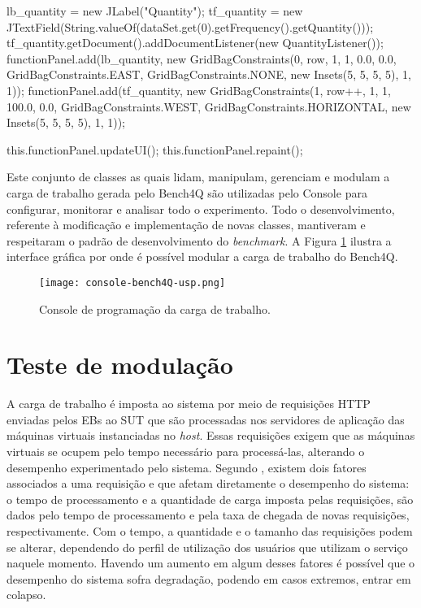 \begin{codigo}[caption={Código para gerar a os parâmetros para a modulação}, label={code:panel}, breaklines=true]
{		lb_quantity = new JLabel("Quantity");
		tf_quantity = new JTextField(String.valueOf(dataSet.get(0).getFrequency().getQuantity()));
		tf_quantity.getDocument().addDocumentListener(new QuantityListener());
		functionPanel.add(lb_quantity, new GridBagConstraints(0, row, 1, 1, 0.0, 0.0, GridBagConstraints.EAST,
		GridBagConstraints.NONE, new Insets(5, 5, 5, 5), 1, 1));
		functionPanel.add(tf_quantity, new GridBagConstraints(1, row++, 1, 1, 100.0, 0.0, GridBagConstraints.WEST,
		GridBagConstraints.HORIZONTAL, new Insets(5, 5, 5, 5), 1, 1));
		
		this.functionPanel.updateUI();
		this.functionPanel.repaint();
		
	}
\end{codigo}

Este conjunto de classes as quais lidam, manipulam, gerenciam e modulam a carga de trabalho gerada pelo Bench4Q são utilizadas pelo Console para configurar, monitorar e analisar todo o experimento. Todo o desenvolvimento, referente à modificação e implementação de novas classes, mantiveram e respeitaram o padrão de desenvolvimento do \textit{benchmark}. A Figura \ref{fig:interface-criada-beanch4q} ilustra a interface gráfica por onde é possível modular a carga de trabalho do Bench4Q. 

\begin{figure}[!htb]
	\centering
	\texttt{[image: console-bench4Q-usp.png]}
	\caption{Console de programação da carga de trabalho.}
	\label{fig:interface-criada-beanch4q}
	\fautor
\end{figure}


\section{Teste de modulação}

A carga de trabalho é imposta ao sistema por meio de requisições HTTP enviadas pelos EBs ao SUT que são processadas nos servidores de aplicação das máquinas virtuais instanciadas no \textit{host}. Essas requisições exigem que as máquinas virtuais se ocupem pelo tempo necessário para processá-las, alterando o desempenho experimentado pelo sistema.
Segundo , existem dois fatores associados a uma requisição e que afetam diretamente o desempenho do sistema:
o tempo de processamento e a quantidade de carga imposta pelas requisições, são dados pelo tempo de processamento e pela taxa de chegada de novas requisições, respectivamente. Com o tempo, a quantidade e o tamanho das requisições podem se alterar, dependendo do perfil de utilização dos usuários que utilizam o serviço naquele momento. Havendo um aumento em algum desses fatores é possível que o desempenho do sistema sofra degradação, podendo em casos extremos, entrar em colapso.

